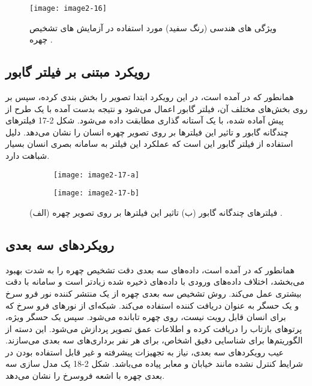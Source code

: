 \begin{figure}[h]
\centering
  \texttt{[image: image2-16]}
  \caption{ویژگی های هندسی (رنگ سفید) مورد استفاده در آزمایش های تشخیص چهره \cite{ref1}.}
  \label{image2-16}
\end{figure}

\subsection{رویکرد مبتنی بر فیلتر گابور ‌}
همانطور که در \cite{ABATE20071885} آمده است، در این رویکرد ابتدا تصویر را بخش بندی کرده، سپس بر روی بخش‌های مختلف آن، فیلتر گابور اعمال می‌شود و نتیجه بدست آمده با یک طرح از پیش آماده شده، با یک آستانه گذاری مطابقت داده می‌شود. شکل 2-17 فیلترهای چندگانه گابور و تاثیر این فیلترها بر روی تصویر چهره انسان را نشان می‌دهد. دلیل استفاده از فیلتر گابور این است که عملکرد این فیلتر به سامانه بصری انسان بسیار شباهت دارد. 
 	 
\begin{figure}
\begin{subfigure}{.5\textwidth}
  \centering
  \texttt{[image: image2-17-a]}
  \label{image2-17-a}
\end{subfigure}
\begin{subfigure}{.5\textwidth}
  \centering
  \texttt{[image: image2-17-b]}
  \label{image2-17-b}
\end{subfigure}
  \caption{(الف) فیلترهای چندگانه گابور (ب) تاثیر این فیلترها بر روی تصویر چهره \cite{ref1}.}
\label{fig:image2-17}
\end{figure}

\subsection{رویکرد‌های سه بعدی}
همانطور که در \cite{10.3745/JIPS.2009.5.2.041} آمده است، داده‌های سه بعدی دقت تشخیص چهره را به شدت بهبود می‌بخشد، اختلاف داده‌های ورودی با داده‌های ذخیره شده زیادتر است و سامانه با دقت بیشتری عمل می‌کند. روش تشخیص سه بعدی چهره از یک منتشر کننده نور فرو سرخ و یک حسگر به عنوان دریافت کننده استفاده می‌کند. شبکه‌ای از نورهای فرو سرخ که برای انسان قابل رویت نیست، روی چهره تابانده می‌شود. سپس یک حسگر ویژه، پرتوهای بازتاب را دریافت کرده و اطلاعات عمق تصویر پردازش می‌شود. این دسته از الگوریتم‌ها برای شناسایی دقیق اشخاص، برای هر نفر برداری‌های سه بعدی می‌سازند. عیب رویکردهای سه بعدی، نیاز به تجهیزات پیشرفته و غیر قابل استفاده بودن در شرایط کنترل نشده مانند خیابان و معابر پیاده می‌باشد. شکل 2-18 یک مدل سازی سه بعدی چهره با اشعه فروسرخ را نشان می‌دهد.

